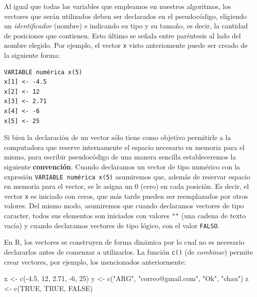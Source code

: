 \documentclass[
]{book}
\newenvironment{Shaded}{\begin{snugshade}}{\end{snugshade}}
\newcommand{\ConstantTok}[1]{\textcolor[rgb]{0.00,0.00,0.00}{#1}}
\newcommand{\DecValTok}[1]{\textcolor[rgb]{0.00,0.00,0.81}{#1}}
\newcommand{\FloatTok}[1]{\textcolor[rgb]{0.00,0.00,0.81}{#1}}
\newcommand{\FunctionTok}[1]{\textcolor[rgb]{0.00,0.00,0.00}{#1}}
\newcommand{\NormalTok}[1]{#1}
\newcommand{\OtherTok}[1]{\textcolor[rgb]{0.56,0.35,0.01}{#1}}
\newcommand{\SpecialCharTok}[1]{\textcolor[rgb]{0.00,0.00,0.00}{#1}}
\newcommand{\StringTok}[1]{\textcolor[rgb]{0.31,0.60,0.02}{#1}}
\begin{document}
Al igual que todas las variables que empleamos en nuestros algoritmos, los vectores que serán utilizados deben ser declarados en el pseudocódigo, eligiendo un \emph{identificador} (nombre) e indicando su tipo y su tamaño, es decir, la cantidad de posiciones que contienen. Esto último se señala entre paréntesis al lado del nombre elegido. Por ejemplo, el vector \texttt{x} visto anteriomente puede ser creado de la siguiente forma:

\begin{verbatim}
VARIABLE numérica x(5)
x[1] <- -4.5
x[2] <- 12
x[3] <- 2.71
x[4] <- -6
x[5] <- 25
\end{verbatim}

Si bien la declaración de un vector sólo tiene como objetivo permitirle a la computadora que reserve internamente el espacio necesario en memoria para el mismo, para escribir pseudocódigo de una manera sencilla estableceremos la siguiente \textbf{convención}. Cuando declaramos un vector de tipo numérico con la expresión \texttt{VARIABLE\ numérica\ x(5)} asumiremos que, además de reservar espacio en memoria para el vector, se le asigna un 0 (cero) en cada posición. Es decir, el vector \texttt{x} es iniciado con ceros, que más tarde pueden ser reemplazados por otros valores. Del mismo modo, asumiremos que cuando declaramos vectores de tipo caracter, todos sus elementos son iniciados con valores \texttt{""} (una cadena de texto vacía) y cuando declaramos vectores de tipo lógico, con el valor \texttt{FALSO}.

En R, los vectores se construyen de forma dinámica por lo cual no es necesario declararlos antes de comenzar a utilizarlos. La función \texttt{c()} (de \emph{combinar}) permite crear vectores, por ejemplo, los mencionados anteriormente:

\begin{Shaded}
\begin{Highlighting}[]
\NormalTok{x }\OtherTok{\textless{}{-}} \FunctionTok{c}\NormalTok{(}\SpecialCharTok{{-}}\FloatTok{4.5}\NormalTok{, }\DecValTok{12}\NormalTok{, }\FloatTok{2.71}\NormalTok{, }\SpecialCharTok{{-}}\DecValTok{6}\NormalTok{, }\DecValTok{25}\NormalTok{)}
\NormalTok{y }\OtherTok{\textless{}{-}} \FunctionTok{c}\NormalTok{(}\StringTok{"ARG"}\NormalTok{, }\StringTok{"correo@gmail.com"}\NormalTok{, }\StringTok{"Ok"}\NormalTok{, }\StringTok{"chau"}\NormalTok{)}
\NormalTok{z }\OtherTok{\textless{}{-}} \FunctionTok{c}\NormalTok{(}\ConstantTok{TRUE}\NormalTok{, }\ConstantTok{TRUE}\NormalTok{, }\ConstantTok{FALSE}\NormalTok{)}
\end{Highlighting}
\end{Shaded}
\end{document}
